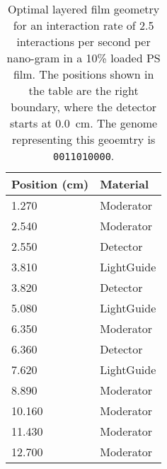 \begin{table}
	\caption[Optimal Layered Film Geometry for 2.5 interaction per second per nanogram Cf-252]{Optimal layered film geometry for an interaction rate of 2.5 interactions per second per nano-gram  in a 10\%  loaded PS film. The positions shown in the table are the right boundary, where the detector starts at \SI{0.0}{\cm}. The genome representing this geoemtry is \texttt{0011010000}.}
	\label{tab:OptGeoDetailed25}
	\begin{tabular}{m{3cm} m{4cm}}
	\toprule
	Position (\si{\cm}) & Material \\
	\midrule
1.270&Moderator\\
2.540&Moderator\\
2.550&Detector\\
3.810&LightGuide\\
3.820&Detector\\
5.080&LightGuide\\
6.350&Moderator\\
6.360&Detector\\
7.620&LightGuide\\
8.890&Moderator\\
10.160&Moderator\\
11.430&Moderator\\
12.700&Moderator\\
	\bottomrule
	\end{tabular}
\end{table}
